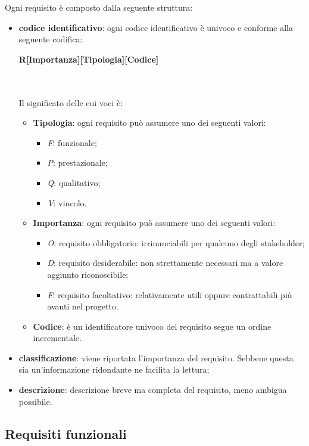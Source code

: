 Ogni requisito è composto dalla seguente struttura:
\begin{itemize}
	\item \textbf{codice identificativo}: ogni codice identificativo è univoco e conforme alla seguente codifica:\\
	\centerline{\textbf{R[Importanza][Tipologia][Codice]}} \\ \\
	Il significato delle cui voci è:
	\begin{itemize}
		\item \textbf{Tipologia}: ogni requisito può assumere uno dei seguenti valori:
		\begin{itemize}
			\item \textit{F}: funzionale;
			\item \textit{P}: prestazionale;
			\item \textit{Q}: qualitativo;
			\item \textit{V}: vincolo.
		\end{itemize}
		\item \textbf{Importanza}: ogni requisito può assumere uno dei seguenti valori:
		\begin{itemize}
			\item \textit{O}: requisito obbligatorio: irrinunciabili per qualcuno degli stakeholder;
			\item \textit{D}: requisito desiderabile: non strettamente necessari ma  a valore aggiunto riconoscibile;
			\item \textit{F}: requisito facoltativo: relativamente utili oppure contrattabili più avanti nel progetto.	
		\end{itemize}
		\item \textbf{Codice}: è un identificatore univoco del requisito segue un ordine incrementale.
	\end{itemize}
	\item \textbf{classificazione}: viene riportata l'importanza del requisito. Sebbene questa sia un'informazione ridondante ne facilita la lettura;
	\item \textbf{descrizione}: descrizione breve ma completa del requisito, meno ambigua possibile.
\end{itemize}
\renewcommand{\arraystretch}{1.5}



\subsection{Requisiti funzionali}

